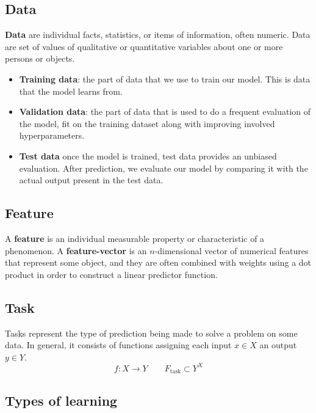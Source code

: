 \documentclass[a4paper,6pt,twocolumn,fleqn]{article}
\begin{document}
\subsection{Data}
\textbf{Data} are individual facts, statistics, or items of information, often numeric. Data are set of values of qualitative or quantitative variables about one or more persons or objects.
\begin{itemize}
    \item \textbf{Training data}: the part of data that we use to train our model. This is data that the model learns from.
    \item \textbf{Validation data}: the part of data that is used to do a frequent evaluation of the model, fit on the training dataset along with improving involved hyperparameters.
    \item \textbf{Test data} once the model is trained, test data provides an unbiased evaluation. After prediction, we evaluate our model by comparing it with the actual output present in the test data.
\end{itemize}
\subsection{Feature}
A \textbf{feature} is an individual measurable property or characteristic of a phenomenon. A \textbf{feature-vector} is an \(n\)-dimensional vector of numerical features that represent some object, and they are often combined with weights using a dot product in order to construct a linear predictor function.
\subsection{Task} %
Tasks represent the type of prediction being made to solve a problem on some data. In general, it consists of functions assigning each input \(x \in X\) an output \(y \in Y\).
\begin{equation}
    f: X \to Y \qquad F_\text{task} \subset Y^X
\end{equation}
\subsection{Types of learning} %
\end{document}
